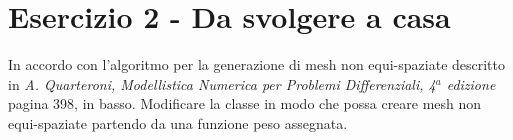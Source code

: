 \section*{Esercizio 2 - Da svolgere a casa}

In accordo con l'algoritmo per la generazione di mesh non
equi-spaziate descritto in \textit{A. Quarteroni, Modellistica
Numerica per Problemi Differenziali, 4$^a$ edizione} pagina 398,
in basso. Modificare la classe  in modo che possa
creare mesh non equi-spaziate partendo da una funzione peso assegnata.
